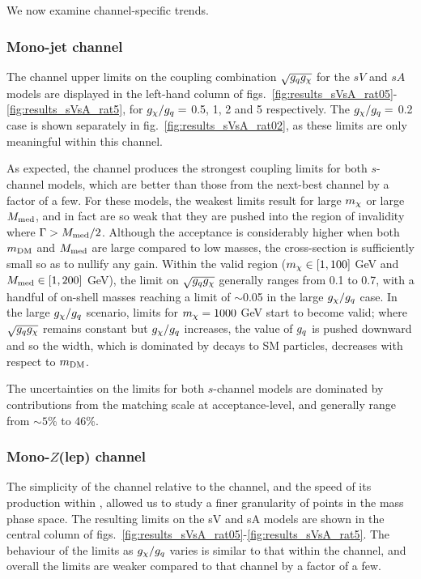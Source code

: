 We now examine channel-specific trends.

\subsubsection{Mono-jet channel}

The \monojet channel upper limits on the coupling combination $\sqrt{g_q g_{\chi}}$ for the $sV$ and $sA$ models are displayed in the left-hand column of figs.~\ref{fig:results_sVsA_rat05}-\ref{fig:results_sVsA_rat5}, for $g_{\chi}/g_q =$ 0.5, 1, 2 and 5 respectively. The $g_{\chi}/g_q =$ 0.2 case is shown separately in fig.~\ref{fig:results_sVsA_rat02}, as these limits are only meaningful within this channel.

As expected, the \monojet channel produces the strongest coupling limits for both $s$-channel models, which are better than those from the next-best \monoZ channel by a factor of a few. For these models, the weakest limits result for large $m_{\chi}$ or large $M_{\mathrm{med}}$, and in fact are so weak that they are pushed into the region of invalidity where $\Gamma > M_{\mathrm{med}}/2$. Although the acceptance is considerably higher when both $m_{\mathrm{DM}}$ and $M_{\mathrm{med}}$ are large compared to low masses, the cross-section is sufficiently small so as to nullify any gain. Within the valid region ($m_{\chi} \in [1, 100]$ GeV and $M_{\mathrm{med}} \in [1, 200]$ GeV), the limit on $\sqrt{g_q g_{\chi}}$ generally ranges from 0.1 to 0.7, with a handful of on-shell masses reaching a limit of $\sim$0.05 in the large $g_{\chi} / g_q$ case. In the large $g_{\chi}/g_q$ scenario, limits for $m_{\chi} = 1000$ GeV start to become valid; where $\sqrt{g_q g_{\chi}}$ remains constant but $g_{\chi} / g_q$ increases, the value of $g_q$ is pushed downward and so the width, which is dominated by decays to SM particles, decreases with respect to $m_{\mathrm{DM}}$.

The uncertainties on the limits for both $s$-channel models are dominated by contributions from the matching scale at acceptance-level, and generally range from $\sim5$\% to 46\%.

\subsubsection{Mono-$Z$(lep) channel}

The simplicity of the \monoZ channel relative to the \monojet channel, and the speed of its production within \MG, allowed us to study a finer granularity of points in the mass phase space. The resulting limits on the sV and sA models are shown in the central column of figs.~\ref{fig:results_sVsA_rat05}-\ref{fig:results_sVsA_rat5}. The behaviour of the limits as $g_{\chi} / g_q$ varies is similar to that within the \monojet channel, and overall the limits are weaker compared to that channel by a factor of a few.

